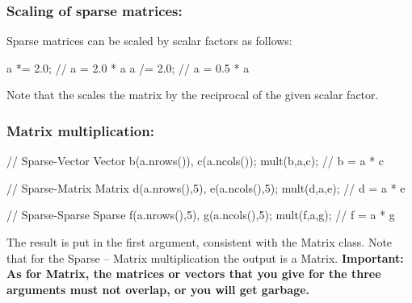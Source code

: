 \subsubsection{Scaling of sparse matrices:}

Sparse matrices can be scaled by scalar factors as follows:
%
\begin{code}
a *= 2.0;  // a = 2.0 * a
a /= 2.0;  // a = 0.5 * a
\end{code}
%
Note that the \shortcode{/=} scales the matrix by the reciprocal of the
given scalar factor.

\subsubsection{Matrix multiplication:}
\begin{code}
// Sparse-Vector
Vector b(a.nrows()), c(a.ncols());
mult(b,a,c);        // b = a * c

// Sparse-Matrix
Matrix d(a.nrows(),5), e(a.ncols(),5);
mult(d,a,e);        // d = a * e

// Sparse-Sparse
Sparse f(a.nrows(),5), g(a.ncols(),5);
mult(f,a,g);        // f = a * g
\end{code}
The result is put in the first argument, consistent with the Matrix class.
Note that for the Sparse -- Matrix multiplication the output is a Matrix.
\textbf{Important: As for Matrix, the matrices or vectors
that you give for the three arguments must not overlap, or you will get
garbage.}





